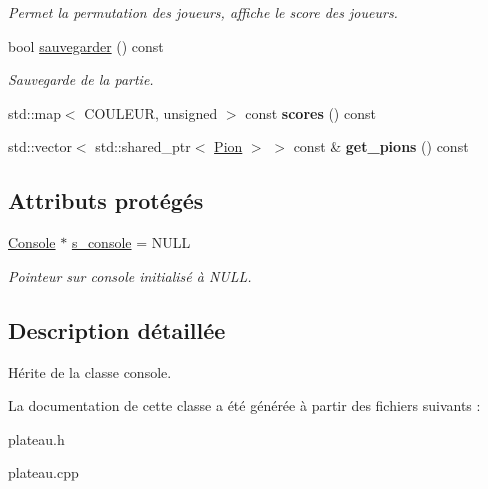 \begin{DoxyCompactItemize}
\begin{DoxyCompactList}\small\item\em Permet la permutation des joueurs, affiche le score des joueurs. \end{DoxyCompactList}\item 
bool \hyperlink{classTableau_a7fe5d033577a970525067422053595ba}{sauvegarder} () const \hypertarget{classTableau_a7fe5d033577a970525067422053595ba}{}\label{classTableau_a7fe5d033577a970525067422053595ba}

\begin{DoxyCompactList}\small\item\em Sauvegarde de la partie. \end{DoxyCompactList}\item 
std\+::map$<$ C\+O\+U\+L\+E\+UR, unsigned $>$ const {\bfseries scores} () const \hypertarget{classTableau_ac3c035ec5fcc5189b04392ff56d0441e}{}\label{classTableau_ac3c035ec5fcc5189b04392ff56d0441e}

\item 
std\+::vector$<$ std\+::shared\+\_\+ptr$<$ \hyperlink{structPion}{Pion} $>$ $>$ const \& {\bfseries get\+\_\+pions} () const \hypertarget{classTableau_a41e9e9c45b4dfea82cf2c4bb64fdf5a6}{}\label{classTableau_a41e9e9c45b4dfea82cf2c4bb64fdf5a6}

\end{DoxyCompactItemize}
\subsection*{Attributs protégés}
\begin{DoxyCompactItemize}
\item 
\hyperlink{classConsole}{Console} $\ast$ \hyperlink{classTableau_a2557f30daf3e8c13d803b3365be83a64}{s\+\_\+console} = N\+U\+LL\hypertarget{classTableau_a2557f30daf3e8c13d803b3365be83a64}{}\label{classTableau_a2557f30daf3e8c13d803b3365be83a64}

\begin{DoxyCompactList}\small\item\em Pointeur sur console initialisé à N\+U\+LL. \end{DoxyCompactList}\end{DoxyCompactItemize}


\subsection{Description détaillée}
Hérite de la classe console. 

La documentation de cette classe a été générée à partir des fichiers suivants \+:\begin{DoxyCompactItemize}
\item 
plateau.\+h\item 
plateau.\+cpp\end{DoxyCompactItemize}
